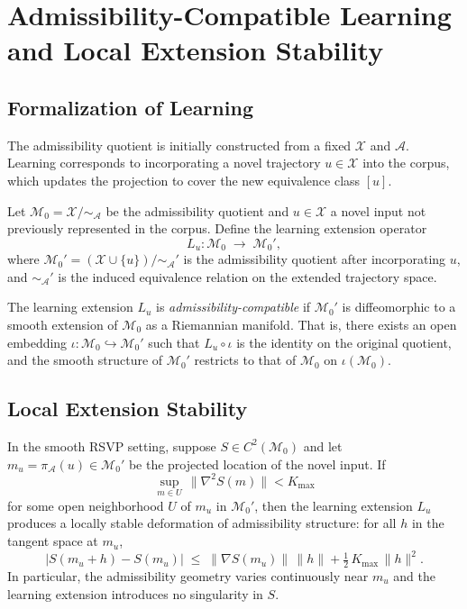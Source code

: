 \documentclass[12pt, a4paper, oneside]{book}
\newcommand{\Adm}{\mathcal{A}}
\newcommand{\X}{\mathcal{X}}
\newcommand{\M}{\mathcal{M}}
\newcommand{\projA}{\pi_{\!\Adm}}
\newcommand{\SA}{{\sim_{\!\Adm}}}
\newcommand{\Ent}{S}
\begin{document}
\chapter{Admissibility-Compatible Learning and Local Extension Stability}
\label{ch:learning}

\section{Formalization of Learning}

The admissibility quotient is initially constructed from a fixed $\X$ and
$\Adm$. Learning corresponds to incorporating a novel trajectory $u \in \X$
into the corpus, which updates the projection to cover the new equivalence
class $[u]$.

\begin{definition}
\label{def:learning-ext}
Let $\M_0 = \X/\SA$ be the admissibility quotient and $u \in \X$ a novel
input not previously represented in the corpus. Define the learning
extension operator
\[
  L_u : \M_0 \;\longrightarrow\; \M_0',
\]
where $\M_0' = (\X \cup \{u\})/\SA'$ is the admissibility quotient after
incorporating $u$, and $\SA'$ is the induced equivalence relation on the
extended trajectory space.
\end{definition}

\begin{definition}
\label{def:adm-compat-learning}
The learning extension $L_u$ is \emph{admissibility-compatible} if
$\M_0'$ is diffeomorphic to a smooth extension of $\M_0$ as a Riemannian
manifold. That is, there exists an open embedding $\iota : \M_0
\hookrightarrow \M_0'$ such that $L_u \circ \iota$ is the identity on
the original quotient, and the smooth structure of $\M_0'$ restricts to
that of $\M_0$ on $\iota(\M_0)$.
\end{definition}

\section{Local Extension Stability}

\begin{theorem}
\label{thm:local-extension}
In the smooth RSVP setting, suppose $\Ent \in C^2(\M_0)$ and let
$m_u = \projA(u) \in \M_0'$ be the projected location of the novel
input. If
\[
  \sup_{m \in U}\, \|\nabla^2 \Ent(m)\| < K_{\max}
\]
for some open neighborhood $U$ of $m_u$ in $\M_0'$, then the learning
extension $L_u$ produces a locally stable deformation of admissibility
structure: for all $h$ in the tangent space at $m_u$,
\[
  \bigl|\Ent(m_u + h) - \Ent(m_u)\bigr|
  \;\leq\;
  \|\nabla \Ent(m_u)\|\,\|h\|
  + \tfrac{1}{2}\, K_{\max}\,\|h\|^2.
\]
In particular, the admissibility geometry varies continuously near
$m_u$ and the learning extension introduces no singularity in $\Ent$.
\end{theorem}
\end{document}
